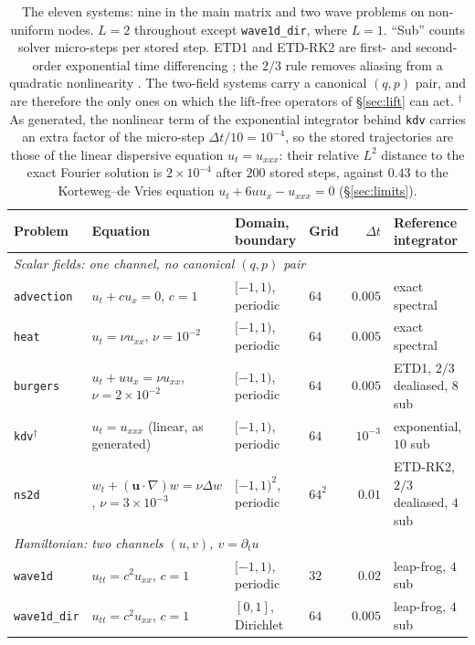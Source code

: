 \documentclass[11pt]{article}
\theoremstyle{definition}
\theoremstyle{remark}
\begin{document}
\begin{table}[htbp]
\centering
\caption{The eleven systems: nine in the main matrix and two wave problems on
non-uniform nodes. $L=2$ throughout except \texttt{wave1d\_dir}, where $L=1$.
``Sub'' counts solver micro-steps per stored step. ETD1 and ETD-RK2 are first- and
second-order exponential time differencing \citep{cox2002etd}; the $2/3$ rule
removes aliasing from a quadratic nonlinearity \citep{orszag1971}. The
two-field systems carry a canonical $(q,p)$ pair, and are therefore the only ones
on which the lift-free operators of \S\ref{sec:lift} can act.
$^{\dagger}$\,As generated, the nonlinear term of the exponential integrator
behind \texttt{kdv} carries an extra factor of the micro-step
$\Delta t/10=10^{-4}$, so the stored trajectories are those of the linear
dispersive equation $u_t=u_{xxx}$: their relative $L^2$ distance to the exact
Fourier solution is $2\times10^{-4}$ after $200$ stored steps, against $0.43$ to
the Korteweg--de Vries equation $u_t+6uu_x-u_{xxx}=0$ (\S\ref{sec:limits}).}
\label{tab:systems}
\footnotesize
\setlength{\tabcolsep}{2pt}
\begin{tabular}{llllrl}
\toprule
Problem & Equation & Domain, boundary & Grid & $\Delta t$ & Reference integrator \\
\midrule
\multicolumn{6}{l}{\emph{Scalar fields: one channel, no canonical $(q,p)$ pair}}\\
\texttt{advection} & $u_t+cu_x=0$, $c=1$ & $[-1,1)$, periodic & $64$ & $0.005$ & exact spectral \\
\texttt{heat} & $u_t=\nu u_{xx}$, $\nu=10^{-2}$ & $[-1,1)$, periodic & $64$ & $0.005$ & exact spectral \\
\texttt{burgers} & $u_t+uu_x=\nu u_{xx}$, $\nu=2\!\times\!10^{-2}$ & $[-1,1)$, periodic & $64$ & $0.005$ & ETD1, $2/3$ dealiased, $8$ sub \\
\texttt{kdv}$^{\dagger}$ & $u_t=u_{xxx}$ (linear, as generated) & $[-1,1)$, periodic & $64$ & $10^{-3}$ & exponential, $10$ sub \\
\texttt{ns2d} & $w_t+(\mathbf{u}\!\cdot\!\nabla)w=\nu\Delta w$, $\nu=3\!\times\!10^{-3}$ & $[-1,1)^2$, periodic & $64^2$ & $0.01$ & ETD-RK2, $2/3$ dealiased, $4$ sub \\
\midrule
\multicolumn{6}{l}{\emph{Hamiltonian: two channels $(u,v)$, $v=\partial_t u$}}\\
\texttt{wave1d} & $u_{tt}=c^2u_{xx}$, $c=1$ & $[-1,1)$, periodic & $32$ & $0.02$ & leap-frog, $4$ sub \\
\texttt{wave1d\_dir} & $u_{tt}=c^2u_{xx}$, $c=1$ & $[0,1]$, Dirichlet & $64$ & $0.005$ & leap-frog, $4$ sub \\

\end{tabular}
\end{table}
\end{document}
